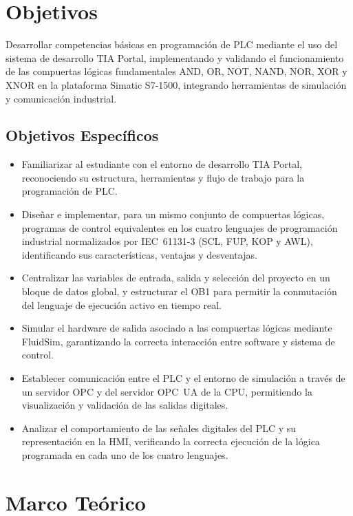 \documentclass[conference]{IEEEtran}
\begin{document}
\section{Objetivos}

Desarrollar competencias básicas en programación de PLC mediante el uso del sistema de desarrollo TIA Portal\textregistered, implementando y validando el funcionamiento de las compuertas lógicas fundamentales AND, OR, NOT, NAND, NOR, XOR y XNOR en la plataforma Simatic S7-1500, integrando herramientas de simulación y comunicación industrial.

\subsection*{Objetivos Específicos}
\begin{itemize}
    \item Familiarizar al estudiante con el entorno de desarrollo TIA Portal\textregistered, reconociendo su estructura, herramientas y flujo de trabajo para la programación de PLC.
    \item Diseñar e implementar, para un mismo conjunto de compuertas lógicas, programas de control equivalentes en los cuatro lenguajes de programación industrial normalizados por IEC~61131-3 (SCL, FUP, KOP y AWL), identificando sus características, ventajas y desventajas.
    \item Centralizar las variables de entrada, salida y selección del proyecto en un bloque de datos global, y estructurar el OB1 para permitir la conmutación del lenguaje de ejecución activo en tiempo real.
    \item Simular el hardware de salida asociado a las compuertas lógicas mediante FluidSim\textregistered, garantizando la correcta interacción entre software y sistema de control.
    \item Establecer comunicación entre el PLC y el entorno de simulación a través de un servidor OPC y del servidor OPC~UA de la CPU, permitiendo la visualización y validación de las salidas digitales.
    \item Analizar el comportamiento de las señales digitales del PLC y su representación en la HMI, verificando la correcta ejecución de la lógica programada en cada uno de los cuatro lenguajes.
\end{itemize}

\section{Marco Teórico}
\label{sec:marco}
\end{document}
